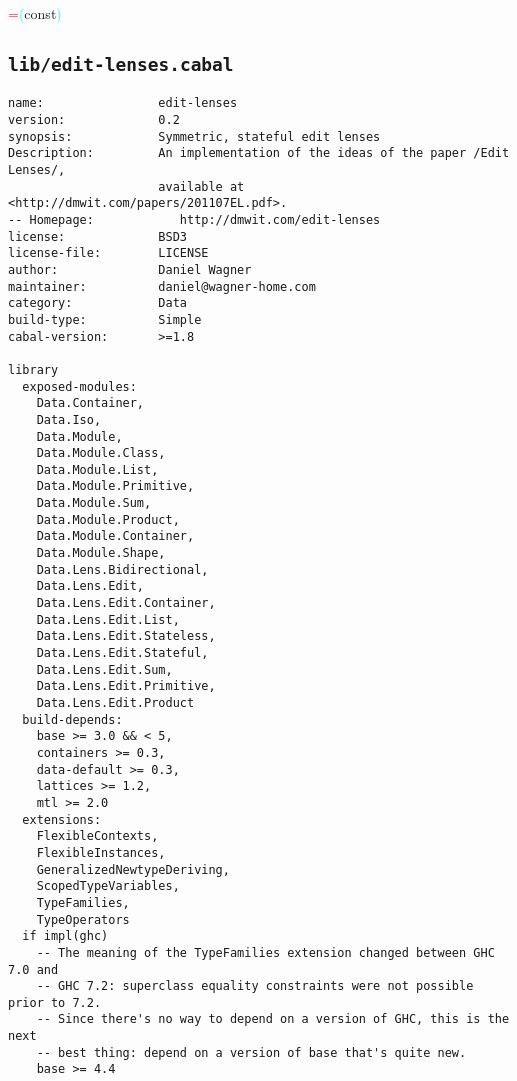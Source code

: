 \hsspace \hsspace \hsspace \hsspace \hsspace \hsspace \hsspace \hsspace \hsspace \hsspace \hsspace \textcolor{red}{=}\hsspace \textcolor{cyan}{(}{\rm{}const}\textcolor{cyan}{)}\\
\subsection{\texttt{lib/edit-lenses.cabal}}
\begin{verbatim}
name:                edit-lenses
version:             0.2
synopsis:            Symmetric, stateful edit lenses
Description:         An implementation of the ideas of the paper /Edit Lenses/,
                     available at <http://dmwit.com/papers/201107EL.pdf>.
-- Homepage:            http://dmwit.com/edit-lenses
license:             BSD3
license-file:        LICENSE
author:              Daniel Wagner
maintainer:          daniel@wagner-home.com
category:            Data
build-type:          Simple
cabal-version:       >=1.8

library
  exposed-modules:
    Data.Container,
    Data.Iso,
    Data.Module,
    Data.Module.Class,
    Data.Module.List,
    Data.Module.Primitive,
    Data.Module.Sum,
    Data.Module.Product,
    Data.Module.Container,
    Data.Module.Shape,
    Data.Lens.Bidirectional,
    Data.Lens.Edit,
    Data.Lens.Edit.Container,
    Data.Lens.Edit.List,
    Data.Lens.Edit.Stateless,
    Data.Lens.Edit.Stateful,
    Data.Lens.Edit.Sum,
    Data.Lens.Edit.Primitive,
    Data.Lens.Edit.Product
  build-depends:
    base >= 3.0 && < 5,
    containers >= 0.3,
    data-default >= 0.3,
    lattices >= 1.2,
    mtl >= 2.0
  extensions:
    FlexibleContexts,
    FlexibleInstances,
    GeneralizedNewtypeDeriving,
    ScopedTypeVariables,
    TypeFamilies,
    TypeOperators
  if impl(ghc)
    -- The meaning of the TypeFamilies extension changed between GHC 7.0 and
    -- GHC 7.2: superclass equality constraints were not possible prior to 7.2.
    -- Since there's no way to depend on a version of GHC, this is the next
    -- best thing: depend on a version of base that's quite new.
    base >= 4.4

\end{verbatim}

